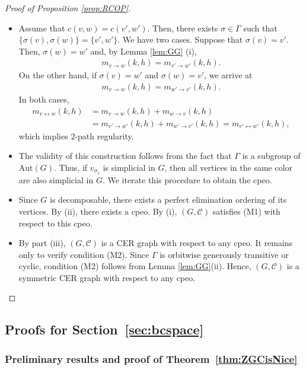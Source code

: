 \documentclass[12pt]{amsart}
\theoremstyle{plain}
\theoremstyle{definition}
\theoremstyle{remark}
\newcommand{\1}{\mathbf{1}}
\begin{document}
\begin{proof}[Proof of Proposition \ref{prop:RCOP}]
\begin{itemize}
    \item[(i)] Assume that $c(v,w)=c(v',w')$. Then, there exists $\sigma\in \Gamma$ such that $\{\sigma(v),\sigma(w)\}=\{v',w'\}$. We have two cases. Suppose that $\sigma(v) = v'$. Then, $\sigma(w)=w'$ and, by Lemma \ref{lem:GG} (i), 
\begin{align*}
m_{v\to w}(k, h) = m_{v'\to w'}(k, h). 
\end{align*}
On the other hand, if  $\sigma(v) = w'$ and $\sigma(w)=v'$, we arrive at 
\begin{align*}
m_{v\to w}(k, h) = m_{w'\to v'}(k, h). 
\end{align*}
In both cases, 
\begin{align*}
m_{v\leftrightarrow w}(k, h) &= m_{v\to w}(k,h)+m_{w\to v}(k,h) \\
&= m_{v'\to w'}(k,h)+m_{w'\to v'}(k,h) = m_{v'\leftrightarrow w'}(k, h),
\end{align*}
which implies $2$-path regularity. 
    \item[(ii)] The validity of this construction follows from the fact that $\Gamma$ is a subgroup of $\mathrm{Aut}(G)$. Thus, if $v_{\sigma_1}$ is simplicial in $G$, then all vertices in the same color are also simplicial in $G$. We iterate this procedure to obtain the cpeo. 
    \item[(iii)] Since $G$ is decomposable, there exists a perfect elimination ordering of its vertices. By (ii), there exists a cpeo. By (i), $(G,\mathcal{C})$ satisfies (M1) with respect to this cpeo. 
    \item[(iv)] By part (iii), \((G,\mathcal{C})\) is a CER graph with respect to any cpeo. It remains only to verify condition (M2). Since \(\Gamma\) is orbitwise generously transitive or cyclic, condition (M2) follows from Lemma \ref{lem:GG}(ii). Hence, \((G,\mathcal{C})\) is a symmetric CER graph with respect to any cpeo.
\end{itemize}
\end{proof}


\subsection{Proofs for Section~\ref{sec:bcspace}}
\subsubsection{Preliminary results and proof of Theorem~\ref{thm:ZGCisNice}}
\end{document}
